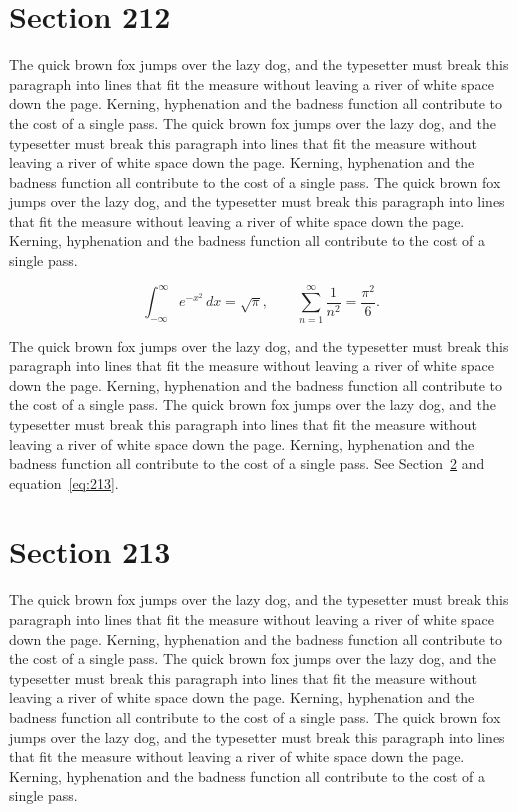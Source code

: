\documentclass{article}
\begin{document}
\section{Section 212}
\label{sec:212}
The quick brown fox jumps over the lazy dog, and the typesetter must break this paragraph into lines that fit the measure without leaving a river of white space down the page. Kerning, hyphenation and the badness function all contribute to the cost of a single pass. The quick brown fox jumps over the lazy dog, and the typesetter must break this paragraph into lines that fit the measure without leaving a river of white space down the page. Kerning, hyphenation and the badness function all contribute to the cost of a single pass. The quick brown fox jumps over the lazy dog, and the typesetter must break this paragraph into lines that fit the measure without leaving a river of white space down the page. Kerning, hyphenation and the badness function all contribute to the cost of a single pass. 

\begin{equation}\label{eq:212}
\int_{-\infty}^{\infty} e^{-x^{2}}\,dx = \sqrt{\pi}, \qquad
\sum_{n=1}^{\infty} \frac{1}{n^{2}} = \frac{\pi^{2}}{6}.
\end{equation}

The quick brown fox jumps over the lazy dog, and the typesetter must break this paragraph into lines that fit the measure without leaving a river of white space down the page. Kerning, hyphenation and the badness function all contribute to the cost of a single pass. The quick brown fox jumps over the lazy dog, and the typesetter must break this paragraph into lines that fit the measure without leaving a river of white space down the page. Kerning, hyphenation and the badness function all contribute to the cost of a single pass. 
See Section~\ref{sec:213} and equation~\eqref{eq:213}.
\section{Section 213}
\label{sec:213}
The quick brown fox jumps over the lazy dog, and the typesetter must break this paragraph into lines that fit the measure without leaving a river of white space down the page. Kerning, hyphenation and the badness function all contribute to the cost of a single pass. The quick brown fox jumps over the lazy dog, and the typesetter must break this paragraph into lines that fit the measure without leaving a river of white space down the page. Kerning, hyphenation and the badness function all contribute to the cost of a single pass. The quick brown fox jumps over the lazy dog, and the typesetter must break this paragraph into lines that fit the measure without leaving a river of white space down the page. Kerning, hyphenation and the badness function all contribute to the cost of a single pass. 
\end{document}
